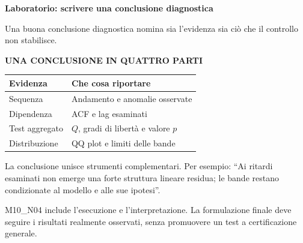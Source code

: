 \documentclass[12pt,aspectratio=1610]{beamer}
\newcommand{\PLabel}[1]{\par{\color{Classical}\bfseries\fontsize{9}{11}\selectfont\MakeUppercase{#1}}\par\vspace{1.8mm}}
\newcommand{\PBody}[1]{\par{\fontsize{11.3}{14.8}\selectfont #1\par}}
\newcommand{\PSmall}[1]{\par{\fontsize{9.8}{13.1}\selectfont #1\par}}
\newcommand{\PInfo}[1]{%
\begin{tcolorbox}[enhanced,arc=1.6mm,boxrule=.55pt,colback=GeoTint,
 colframe=Rule!80!Classical,left=2.3mm,right=2.3mm,top=2mm,bottom=2mm,
 before skip=1mm,after skip=1mm]
\PSmall{#1}\end{tcolorbox}}
\begin{document}
\begin{frame}[plain]\hypertarget{slide69}{}
\begin{lrbox}{\TitleBox}
\begin{minipage}[t]{17.7cm}\raggedright\color{Ink}\fontsize{11.3}{14.8}\selectfont
\color{Navy}\bfseries\fontsize{20.6}{24.5}\selectfont Laboratorio: scrivere una conclusione diagnostica
\end{minipage}\end{lrbox}

\begin{lrbox}{\RecallBox}
\begin{minipage}[t]{14.3cm}\raggedright\color{Ink}\fontsize{11.3}{14.8}\selectfont
\fontsize{10.3}{13.8}\selectfont Una buona conclusione diagnostica nomina sia l’evidenza sia ciò che il controllo non stabilisce.
\end{minipage}\end{lrbox}

\begin{lrbox}{\PilotLeftBox}
\begin{minipage}[t]{10.05cm}\raggedright\color{Ink}\fontsize{11.3}{14.8}\selectfont
\PLabel{Una conclusione in quattro parti}
{\fontsize{10.2}{13.1}\selectfont\renewcommand{\arraystretch}{1.45}\begin{tabular}{@{}p{3.1cm}p{6.0cm}@{}}\toprule
\textbf{Evidenza} & \textbf{Che cosa riportare}\\\midrule
Sequenza & Andamento e anomalie osservate\\
Dipendenza & ACF e lag esaminati\\
Test aggregato & $Q$, gradi di libertà e valore $p$\\
Distribuzione & QQ plot e limiti delle bande\\
\bottomrule\end{tabular}}

\end{minipage}\end{lrbox}

\begin{lrbox}{\PilotRightBox}
\begin{minipage}[t]{7.55cm}\raggedright\color{Ink}\fontsize{11.3}{14.8}\selectfont
\PBody{La conclusione unisce strumenti complementari. Per esempio: “Ai ritardi esaminati non emerge una forte struttura lineare residua; le bande restano condizionate al modello e alle sue ipotesi”.}
\vspace{2.5mm}
\PInfo{M10\_N04 include l’esecuzione e l’interpretazione. La formulazione finale deve seguire i risultati realmente osservati, senza promuovere un test a certificazione generale.}


\end{minipage}
\end{lrbox}
\end{frame}
\end{document}
